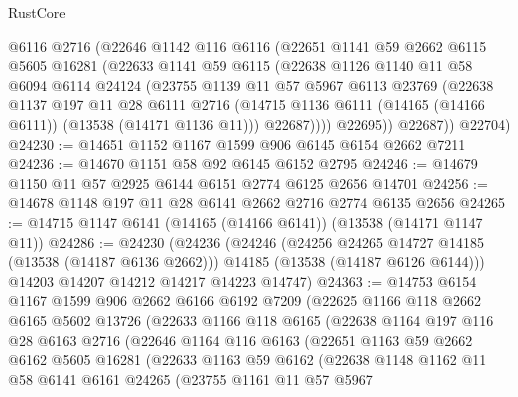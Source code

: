 \begin{lexlean}{RustCore}
\begin{coremodule}
          @6116
          @2716
          (@22646
            @1142
            @116
            @6116
            (@22651
              @1141
              @59
              @2662
              @6115
              @5605
              @16281
              (@22633
                @1141
                @59
                @6115
                (@22638
                  @1126
                  @1140
                  @11
                  @58
                  @6094
                  @6114
                  @24124
                  (@23755
                    @1139
                    @11
                    @57
                    @5967
                    @6113
                    @23769
                    (@22638
                      @1137
                      @197
                      @11
                      @28
                      @6111
                      @2716
                      (@14715 @1136 @6111 (@14165 (@14166 @6111)) (@13538 (@14171 @1136 @11)))
                      @22687))))
              @22695))
          @22687))
      @22704)
@24230 := @14651 @1152 @1167 @1599 @906 @6145 @6154 @2662 @7211
@24236 := @14670 @1151 @58 @92 @6145 @6152 @2795
@24246 := @14679 @1150 @11 @57 @2925 @6144 @6151 @2774 @6125 @2656 @14701
@24256 := @14678 @1148 @197 @11 @28 @6141 @2662 @2716 @2774 @6135 @2656
@24265 := @14715 @1147 @6141 (@14165 (@14166 @6141)) (@13538 (@14171 @1147 @11))
@24286 := @24230
    (@24236
      (@24246
        (@24256 @24265 @14727 @14185 (@13538 (@14187 @6136 @2662)))
        @14185
        (@13538 (@14187 @6126 @6144)))
      @14203
      @14207
      @14212
      @14217
      @14223
      @14747)
@24363 := @14753
    @6154
    @1167
    @1599
    @906
    @2662
    @6166
    @6192
    @7209
    (@22625
      @1166
      @118
      @2662
      @6165
      @5602
      @13726
      (@22633
        @1166
        @118
        @6165
        (@22638
          @1164
          @197
          @116
          @28
          @6163
          @2716
          (@22646
            @1164
            @116
            @6163
            (@22651
              @1163
              @59
              @2662
              @6162
              @5605
              @16281
              (@22633
                @1163
                @59
                @6162
                (@22638
                  @1148
                  @1162
                  @11
                  @58
                  @6141
                  @6161
                  @24265
                  (@23755
                    @1161
                    @11
                    @57
                    @5967

\end{coremodule}
\end{lexlean}
